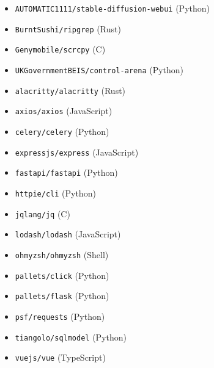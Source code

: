 \documentclass{article}
\begin{document}
\begin{itemize}
    \item \texttt{AUTOMATIC1111/stable-diffusion-webui} (Python)
    \item \texttt{BurntSushi/ripgrep} (Rust)
    \item \texttt{Genymobile/scrcpy} (C)
    \item \texttt{UKGovernmentBEIS/control-arena} (Python)
    \item \texttt{alacritty/alacritty} (Rust)
    \item \texttt{axios/axios} (JavaScript)
    \item \texttt{celery/celery} (Python)
    \item \texttt{expressjs/express} (JavaScript)
    \item \texttt{fastapi/fastapi} (Python)
    \item \texttt{httpie/cli} (Python)
    \item \texttt{jqlang/jq} (C)
    \item \texttt{lodash/lodash} (JavaScript)
    \item \texttt{ohmyzsh/ohmyzsh} (Shell)
    \item \texttt{pallets/click} (Python)
    \item \texttt{pallets/flask} (Python)
    \item \texttt{psf/requests} (Python)
    \item \texttt{tiangolo/sqlmodel} (Python)
    \item \texttt{vuejs/vue} (TypeScript)
\end{itemize}
\end{document}
